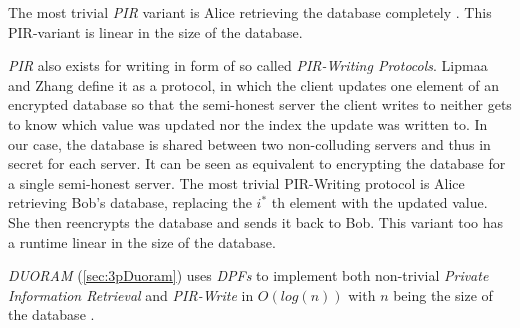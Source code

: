 The most trivial \textit{PIR} variant is Alice retrieving the database completely \cite{gasarch2004survey}.
This PIR-variant is linear in the size of the database.

\textit{PIR} also exists for writing in form of so called \textit{PIR-Writing Protocols}.
Lipmaa and Zhang \cite{lipmaa2010pirwriting} define it as a protocol, in which the client updates one element of an encrypted database so that the semi-honest server the client writes to neither gets to know which value was updated nor the index the update was written to.
In our case, the database is shared between two non-colluding servers and thus in secret for each server.
It can be seen as equivalent to encrypting the database for a single semi-honest server.
The most trivial PIR-Writing protocol is Alice retrieving Bob's database, replacing the $i^*$ th element with the updated value.
She then reencrypts the database and sends it back to Bob.
This variant too has a runtime linear in the size of the database.

\textit{DUORAM} (\ref{sec:3pDuoram}) uses \textit{DPFs} to implement both non-trivial \textit{Private Information Retrieval} and \textit{PIR-Write} in $O(log(n))$ with $n$ being the size of the database \cite{vadapalli2023duoram}.
